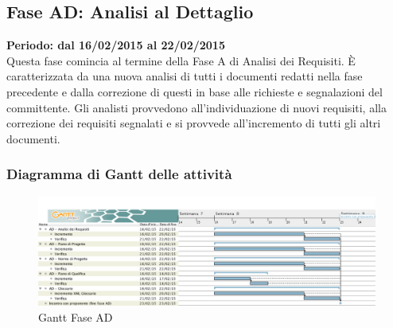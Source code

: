 \subsection{Fase AD: Analisi al Dettaglio}
\textbf{Periodo: dal 16/02/2015 al 22/02/2015}
\\
Questa fase comincia al termine della Fase A di Analisi dei Requisiti. È caratterizzata da una nuova analisi di tutti i documenti redatti nella fase precedente e dalla correzione di questi in base alle richieste e segnalazioni del committente. Gli analisti provvedono all'individuazione di nuovi requisiti, alla correzione dei requisiti segnalati e si provvede all'incremento di tutti gli altri documenti.
\subsubsection{Diagramma di Gantt delle attività}
\begin{center}
	\begin{figure}[H]\centering
		\includegraphics[width=\textwidth]{PianoDiProgetto/Pics/FaseAD.png}
		\caption{Gantt Fase AD}
	\end{figure}
\end{center}